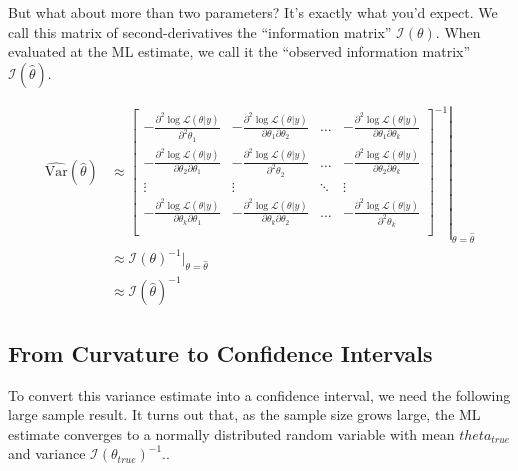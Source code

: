 \documentclass[
]{book}
\begin{document}
But what about more than two parameters? It's exactly what you'd expect. We call this matrix of second-derivatives the ``information matrix'' \(\mathcal{I}(\theta)\). When evaluated at the ML estimate, we call it the ``observed information matrix'' \(\mathcal{I}(\hat{\theta})\).

\[
\begin{equation*}
\begin{aligned}
\widehat{\text{Var}}(\hat{\theta}) &\approx \left. \left[ 
\displaystyle \begin{matrix}
- \frac{\partial^2 \log \mathcal{L}(\theta| y)}{\partial^2 \theta_1} & - \frac{\partial^2 \log \mathcal{L}(\theta| y)}{\partial \theta_1 \partial \theta_2} & \ldots &- \frac{\partial^2 \log \mathcal{L}(\theta| y)}{\partial \theta_1 \partial \theta_k}\\
- \frac{\partial^2 \log \mathcal{L}(\theta| y)}{\partial \theta_2 \partial \theta_1} & - \frac{\partial^2 \log \mathcal{L}(\theta| y)}{\partial^2 \theta_2} & \ldots & - \frac{\partial^2 \log \mathcal{L}(\theta| y)}{\partial \theta_2 \partial \theta_k}\\
\vdots & \vdots & \ddots & \vdots \\
- \frac{\partial^2 \log \mathcal{L}(\theta| y)}{\partial \theta_k \partial \theta_1}     & - \frac{\partial^2 \log \mathcal{L}(\theta| y)}{\partial \theta_k \partial \theta_2} & \ldots & - \frac{\partial^2 \log \mathcal{L}(\theta| y)}{\partial^2 \theta_k}\\
\end{matrix}\right]^{-1} \right|_{\theta = \hat{\theta}}\\
 & \approx \mathcal{I}(\theta)^{-1}|_{\theta = \hat{\theta}}\\
 &\approx \mathcal{I}(\hat{\theta})^{-1}
\end{aligned}
\end{equation*}
\]

\hypertarget{from-curvature-to-confidence-intervals}{%
\subsection{From Curvature to Confidence Intervals}\label{from-curvature-to-confidence-intervals}}

To convert this variance estimate into a confidence interval, we need the following large sample result. It turns out that, as the sample size grows large, the ML estimate converges to a normally distributed random variable with mean \(theta_{true}\) and variance \(\mathcal{I}(\theta_{true})^{-1}\)..
\end{document}
